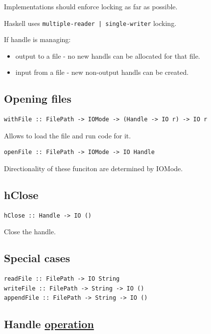 \documentclass[a4paper,14pt,oneside]{book}
\begin{document}
Implementations should enforce locking as far as possible.

Haskell uses \texttt{multiple-reader | single-writer} locking.

If handle is managing:
\begin{itemize}
\item output to a file - no new handls can be allocated for that file.

\item input from a file - new non-output handls can be created.
\end{itemize}

\subsection{Opening files}
\label{sec:orgcc0ffe5}

\begin{verbatim}
withFile :: FilePath -> IOMode -> (Handle -> IO r) -> IO r
\end{verbatim}

Allows to load the file and run code for it.

\begin{verbatim}
openFile :: FilePath -> IOMode -> IO Handle
\end{verbatim}

Directionality of these funciton are determined by IOMode.

\subsection{hClose}
\label{sec:org7760a9b}

\begin{verbatim}
hClose :: Handle -> IO ()
\end{verbatim}

Close the handle.

\subsection{Special cases}
\label{sec:orga2b5bec}

\begin{verbatim}
readFile :: FilePath -> IO String
writeFile :: FilePath -> String -> IO ()
appendFile :: FilePath -> String -> IO ()
\end{verbatim}

\subsection{Handle \hyperref[orgaf16e3c]{operation}}
\label{sec:orge9d3a23}
\end{document}
